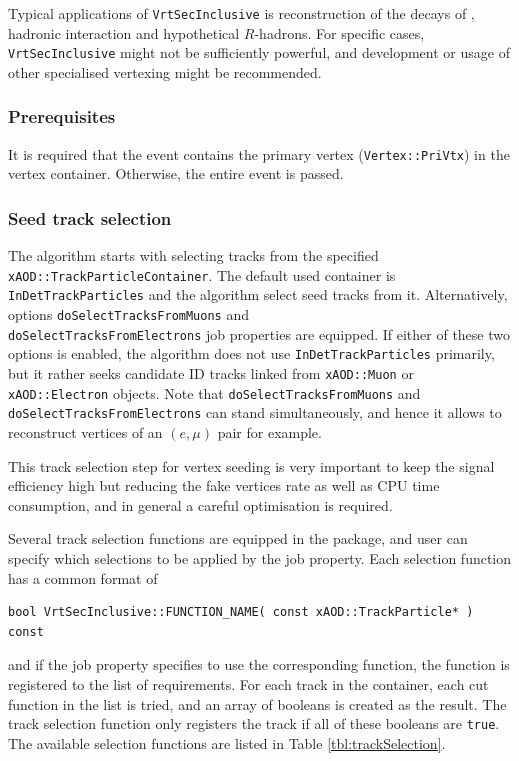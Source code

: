 Typical applications of {\tt VrtSecInclusive} is reconstruction of the decays of \Kshort, hadronic interaction and hypothetical $R$-hadrons. For specific cases, {\tt VrtSecInclusive} might not be sufficiently powerful, and development or usage of other specialised vertexing might be recommended.

\subsubsection{Prerequisites}
It is required that the event contains the primary vertex ({\tt Vertex::PriVtx}) in the vertex container. Otherwise, the entire event is passed.

\subsubsection{Seed track selection}
The algorithm starts with selecting tracks from the specified {\tt xAOD::TrackParticleContainer}. The default used container is {\tt InDetTrackParticles} and the algorithm select seed tracks from it. Alternatively, options {\tt doSelectTracksFromMuons} and\\ {\tt doSelectTracksFromElectrons} job properties are equipped. If either of these two options is enabled, the algorithm does not use {\tt InDetTrackParticles} primarily, but it rather seeks candidate ID tracks linked from {\tt xAOD::Muon} or {\tt xAOD::Electron} objects. Note that {\tt doSelectTracksFromMuons} and {\tt doSelectTracksFromElectrons} can stand simultaneously, and hence it allows to reconstruct vertices of an $(e,\mu)$ pair for example.

This track selection step for vertex seeding is very important to keep the signal efficiency high but reducing the fake vertices rate as well as CPU time consumption, and in general a careful optimisation is required.

Several track selection functions are equipped in the package, and user can specify which selections to be applied by the job property. Each selection function has a common format of
\begin{scriptsize}
\begin{verbatim}
bool VrtSecInclusive::FUNCTION_NAME( const xAOD::TrackParticle* ) const
\end{verbatim}
\end{scriptsize}

and if the job property specifies to use the corresponding function, the function is registered to the list of requirements. For each track in the container, each cut function in the list is tried, and an array of booleans is created as the result. The track selection function only registers the track if all of these booleans are {\tt true}. The available selection functions are listed in Table \ref{tbl:trackSelection}.

